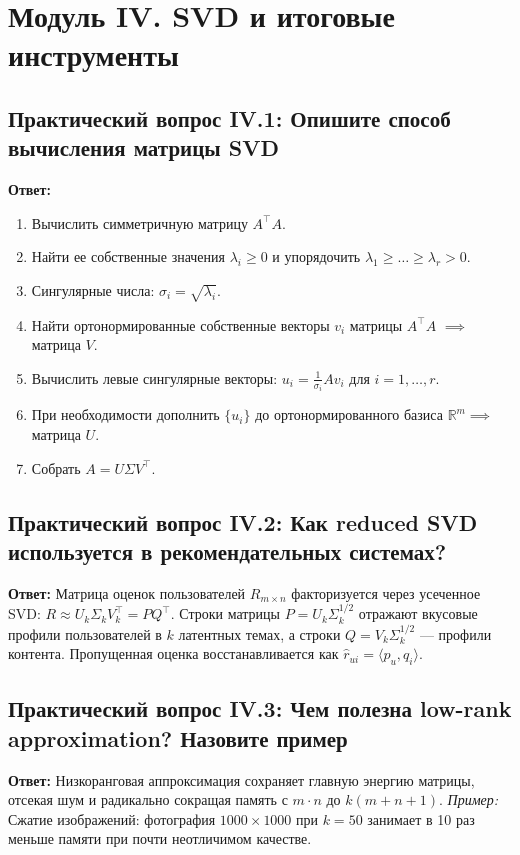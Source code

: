 \newpage

\section{Модуль IV. SVD и итоговые инструменты}

\subsection{Практический вопрос IV.1: Опишите способ вычисления матрицы SVD}
\textbf{Ответ:}
\begin{enumerate}
    \item Вычислить симметричную матрицу $A^\top A$.
    \item Найти ее собственные значения $\lambda_i \ge 0$ и упорядочить $\lambda_1 \ge \dots \ge \lambda_r > 0$.
    \item Сингулярные числа: $\sigma_i = \sqrt{\lambda_i}$.
    \item Найти ортонормированные собственные векторы $v_i$ матрицы $A^\top A$ $\implies$ матрица $V$.
    \item Вычислить левые сингулярные векторы: $u_i = \frac{1}{\sigma_i} A v_i$ для $i = 1, \dots, r$.
    \item При необходимости дополнить $\{u_i\}$ до ортонормированного базиса $\mathbb{R}^m \implies$ матрица $U$.
    \item Собрать $A = U \Sigma V^\top$.
\end{enumerate}

\subsection{Практический вопрос IV.2: Как reduced SVD используется в рекомендательных системах?}
\textbf{Ответ:} Матрица оценок пользователей $R_{m \times n}$ факторизуется через усеченное SVD: $R \approx U_k \Sigma_k
V_k^\top = P Q^\top$.
Строки матрицы $P = U_k \Sigma_k^{1/2}$ отражают вкусовые профили пользователей в $k$ латентных темах, а строки $Q = V_k
\Sigma_k^{1/2}$ — профили контента.
Пропущенная оценка восстанавливается как $\hat{r}_{ui} = \langle p_u, q_i \rangle$.

\subsection{Практический вопрос IV.3: Чем полезна low-rank approximation? Назовите пример}
\textbf{Ответ:} Низкоранговая аппроксимация сохраняет главную энергию матрицы, отсекая шум и радикально сокращая память
с $m \cdot n$ до $k(m + n + 1)$.
\emph{Пример:} Сжатие изображений: фотография $1000 \times 1000$ при $k = 50$ занимает в 10 раз меньше памяти при почти
неотличимом качестве.

